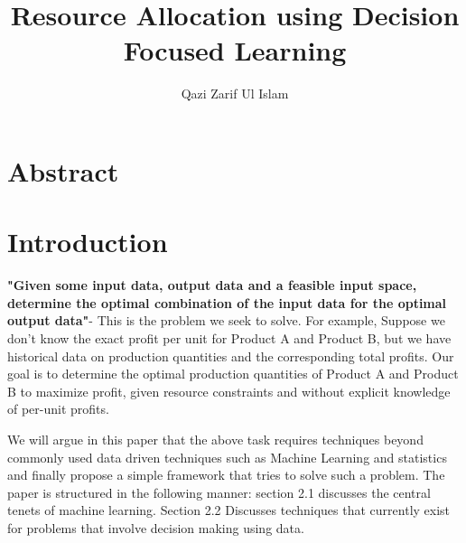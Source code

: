 \documentclass[12pt, letterpaper]{article}
\title{Resource Allocation using Decision Focused Learning}
\author{Qazi Zarif Ul Islam}
\begin{document}
\maketitle

\section{Abstract}

\section{Introduction}

\textbf{"Given some input data, output data and a feasible input space, determine the optimal combination 
of the input data for the optimal output data"}- This is the problem we seek to solve. For example,
Suppose we don't know the exact profit per unit for Product A and Product B, but we have historical data on 
production quantities and the corresponding total profits. Our goal is to determine the optimal production 
quantities of Product A and Product B to maximize profit, given resource constraints and without explicit 
knowledge of per-unit profits.

We will argue in this paper that the above task requires techniques beyond commonly used data driven
techniques such as Machine Learning and statistics and finally propose a simple framework that tries
to solve such a problem. The paper is structured in the following manner: section 2.1 discusses the 
central tenets of machine learning. Section 2.2 Discusses techniques that currently exist for problems
that involve decision making using data.

\end{document}
